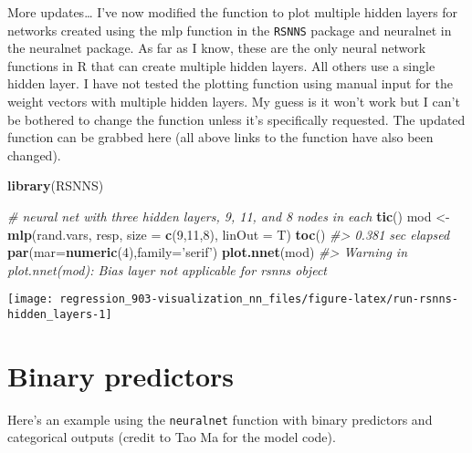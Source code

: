 \documentclass[]{book}
\newenvironment{Shaded}{\begin{snugshade}}{\end{snugshade}}
\newcommand{\CommentTok}[1]{\textcolor[rgb]{0.56,0.35,0.01}{\textit{#1}}}
\newcommand{\DataTypeTok}[1]{\textcolor[rgb]{0.13,0.29,0.53}{#1}}
\newcommand{\DecValTok}[1]{\textcolor[rgb]{0.00,0.00,0.81}{#1}}
\newcommand{\KeywordTok}[1]{\textcolor[rgb]{0.13,0.29,0.53}{\textbf{#1}}}
\newcommand{\NormalTok}[1]{#1}
\newcommand{\StringTok}[1]{\textcolor[rgb]{0.31,0.60,0.02}{#1}}
\begin{document}
More updates\ldots{} I've now modified the function to plot multiple hidden layers for networks created using the mlp function in the \texttt{RSNNS} package and neuralnet in the neuralnet package. As far as I know, these are the only neural network functions in R that can create multiple hidden layers. All others use a single hidden layer. I have not tested the plotting function using manual input for the weight vectors with multiple hidden layers. My guess is it won't work but I can't be bothered to change the function unless it's specifically requested. The updated function can be grabbed here (all above links to the function have also been changed).

\begin{Shaded}
\begin{Highlighting}[]
\KeywordTok{library}\NormalTok{(RSNNS)}
 
\CommentTok{# neural net with three hidden layers, 9, 11, and 8 nodes in each}
\KeywordTok{tic}\NormalTok{()}
\NormalTok{mod <-}\KeywordTok{mlp}\NormalTok{(rand.vars, resp, }
          \DataTypeTok{size =} \KeywordTok{c}\NormalTok{(}\DecValTok{9}\NormalTok{,}\DecValTok{11}\NormalTok{,}\DecValTok{8}\NormalTok{), }
          \DataTypeTok{linOut =}\NormalTok{ T)}
\KeywordTok{toc}\NormalTok{()}
\CommentTok{#> 0.381 sec elapsed}
\KeywordTok{par}\NormalTok{(}\DataTypeTok{mar=}\KeywordTok{numeric}\NormalTok{(}\DecValTok{4}\NormalTok{),}\DataTypeTok{family=}\StringTok{'serif'}\NormalTok{)}
\KeywordTok{plot.nnet}\NormalTok{(mod)}
\CommentTok{#> Warning in plot.nnet(mod): Bias layer not applicable for rsnns object}
\end{Highlighting}
\end{Shaded}

\begin{center}\texttt{[image: regression\_903-visualization\_nn\_files/figure-latex/run-rsnns-hidden\_layers-1]} \end{center}

\hypertarget{binary-predictors}{%
\section{Binary predictors}\label{binary-predictors}}

Here's an example using the \texttt{neuralnet} function with binary predictors and categorical outputs (credit to Tao Ma for the model code).
\end{document}
